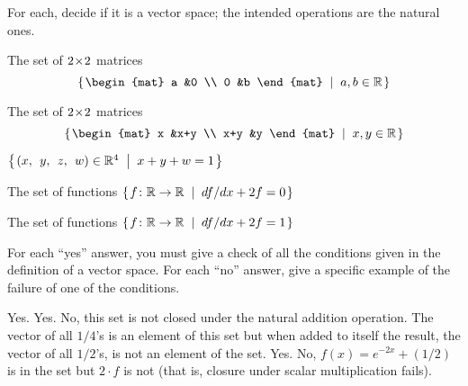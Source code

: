 
\begin{Exercise}[
name={},
title={}, 
difficulty=0,
origin={\cite{JH}}]
For each, decide if it is a vector space;
the intended operations are the natural ones.

\Question The set of  \( 2 \! \times \! 2 \) matrices
        \begin{equation*}
          \set{\begin{mat}
            a  &0  \\
            0  &b
          \end{mat}\suchthat a,b\in\Re}
        \end{equation*}

\Question The set of \( 2 \! \times \! 2 \) matrices
        \begin{equation*}
          \set{\begin{mat}
            x    &x+y  \\
            x+y  &y
          \end{mat}\suchthat x,y\in\Re}
        \end{equation*}

\Question \(\set{\rowvec{x,& y,& z,& w}\in\Re^4
               \suchthat x+y+w=1}
\)

\Question The set of functions
\( \mbox{$\left\{\hspace{0.1em}\mbox{$f\colon \mathbb{R}\to \mathbb{R}$}\;\;\middle|\;\; df/dx+2f=0\hspace{0.1em}\right\}$} \)

\Question The set of functions
\( \mbox{$\left\{\hspace{0.1em}\mbox{$f\colon \mathbb{R}\to \mathbb{R}$}\;\;\middle|\;\; df/dx+2f=1\hspace{0.1em}\right\}$} \)

\end{Exercise}

\begin{Answer}
For each ``yes'' answer, you must give a check of all the
conditions given in the definition of a vector space.
For each ``no'' answer, give a specific example of the failure
of one of the conditions.

\Question Yes.
\Question Yes.
\Question No, this set is not closed under the natural addition
          operation.
          The vector of all $1/4$'s is an element of this set
          but when added to itself the result, the
          vector of all $1/2$'s, is not an element of the set.
\Question Yes.
\Question No, \( f(x)=e^{-2x}+(1/2) \) is in the set but
           \( 2\cdot f \) is not (that is, closure under scalar multiplication fails).
\end{Answer}
